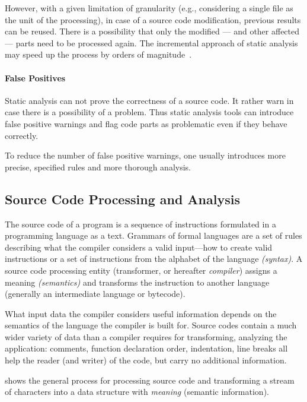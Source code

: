 However, with a given limitation of granularity (e.g., considering a single file as the unit of the processing), in case of a source code modification, previous results can be reused. There is a possibility that only the modified --- and other affected --- parts need to be processed again. The incremental approach of static analysis may speed up the process by orders of magnitude~\cite{stein-daniel-bsc}.

\paragraph{False Positives} Static analysis can not prove the correctness of a source code. It rather warn in case there is a possibility of a problem. Thus static analysis tools can introduce false positive warnings and flag code parts as problematic even if they behave correctly.

To reduce the number of false positive warnings, one usually introduces more precise, specified rules and more thorough analysis.~\cite{clang}

\subsection{Source Code Processing and Analysis}
\label{sect:source-code-processing}
The source code of a program is a sequence of instructions formulated in a programming language as a text. Grammars of formal languages are a set of rules describing what the compiler considers a valid input---how to create valid instructions or a set of instructions from the alphabet of the language \emph{(syntax)}. A source code processing entity (transformer, or hereafter \emph{compiler}) assigns a meaning \emph{(semantics)} and transforms the instruction to another language (generally an intermediate language or bytecode).

What input data the compiler considers useful information depends on the semantics of the language the compiler is built for. Source codes contain a much wider variety of data than a compiler requires for transforming, analyzing the application: comments, function declaration order, indentation, line breaks all help the reader (and writer) of the code, but carry no additional information.


 shows the general process for processing source code and transforming a stream of characters into a data structure with \emph{meaning} (semantic information).

